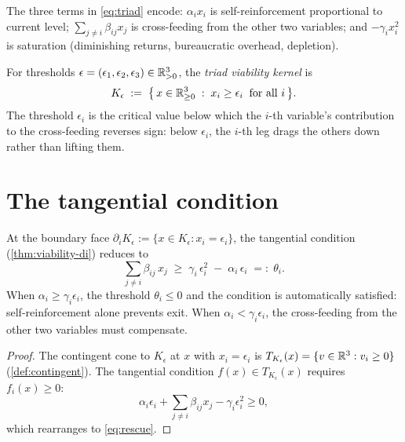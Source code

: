 The three terms in \eqref{eq:triad} encode:
$\alpha_i x_i$ is self-reinforcement proportional to current level;
$\sum_{j \neq i} \beta_{ij} x_j$ is cross-feeding from the other
two variables; and $-\gamma_i x_i^2$ is saturation (diminishing
returns, bureaucratic overhead, depletion).

\begin{definition}\label{def:triad-kernel}
For thresholds $\epsilon = (\epsilon_1, \epsilon_2, \epsilon_3)
\in \mathbb{R}^3_{> 0}$, the \emph{triad viability kernel} is
\[
  K_\epsilon \;:=\;
  \bigl\{\, x \in \mathbb{R}^3_{\geq 0} \;:\;
  x_i \geq \epsilon_i \;\;\text{for all } i \,\bigr\}.
\]
The threshold $\epsilon_i$ is the critical value below which the
$i$-th variable's contribution to the cross-feeding reverses sign:
below $\epsilon_i$, the $i$-th leg drags the others down rather
than lifting them.
\end{definition}

\section{The tangential condition}\label{sec:triad-tangential}

\begin{proposition}\label{prop:boundary-rescue}
At the boundary face $\partial_i K_\epsilon :=
\{x \in K_\epsilon : x_i = \epsilon_i\}$, the tangential
condition (\cref{thm:viability-di}) reduces to
\begin{equation}\label{eq:rescue}
  \sum_{j \neq i} \beta_{ij}\, x_j
  \;\geq\;
  \gamma_i\, \epsilon_i^2 \;-\; \alpha_i\, \epsilon_i
  \;=:\; \theta_i.
\end{equation}
When $\alpha_i \geq \gamma_i \epsilon_i$, the threshold
$\theta_i \leq 0$ and the condition is automatically satisfied:
self-reinforcement alone prevents exit.  When
$\alpha_i < \gamma_i \epsilon_i$, the cross-feeding from the
other two variables must compensate.
\end{proposition}

\begin{proof}
The contingent cone to $K_\epsilon$ at $x$ with $x_i = \epsilon_i$
is $T_{K_\epsilon}(x) = \{v \in \mathbb{R}^3 : v_i \geq 0\}$
(\cref{def:contingent}).  The tangential condition
$f(x) \in T_{K_\epsilon}(x)$ requires $f_i(x) \geq 0$:
\[
  \alpha_i \epsilon_i + \sum_{j \neq i} \beta_{ij} x_j
  - \gamma_i \epsilon_i^2 \geq 0,
\]
which rearranges to \eqref{eq:rescue}.
\end{proof}

